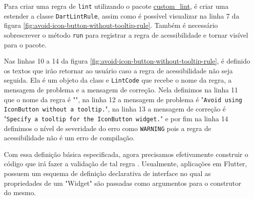 Para criar uma regra de \texttt{lint} utilizando o pacote \href{https://pub.dev/packages/custom_lint}{custom\_lint}, é criar uma estender a classe \texttt{DartLintRule}, assim como é possível visualizar na linha 7 da figura \ref{fig:avoid-icon-button-without-tooltip-rule}. Também é necessário sobrescrever o método \texttt{run} para registrar a regra de acessibilidade e tornar visível para o pacote.

Nas linhas 10 a 14 da figura \ref{fig:avoid-icon-button-without-tooltip-rule}, é definido os textos que irão retornar ao usuário caso a regra de acessibilidade não seja seguida. Ela é um objeto da class e \texttt{LintCode} que recebe o nome da regra, a mensagem de problema e a mensagem de correção. Nela definimos na linha 11 que o nome da regra é "", na linha 12 a mensagem de problema é "\texttt{Avoid using IconButton without a tooltip.}", na linha 13 a mensagem de correção é "\texttt{Specify a tooltip for the IconButton widget.}" e por fim na linha 14 definimos o nível de severidade do erro como \texttt{WARNING} pois a regra de acessibilidade não é um erro de compilação.

Com essa definição básica especificada, agora precisamos efetivamente construir o código que irá fazer a validação de tal regra \cite{customlintbuilder}. Usualmente, aplicações em Flutter, possuem um esquema de definição declarativa de interface no qual as propriedades de um "Widget" são passadas como argumentos para o construtor do mesmo.

